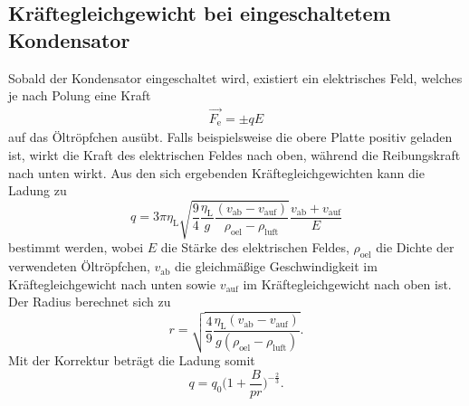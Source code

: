 \subsection{Kräftegleichgewicht bei eingeschaltetem Kondensator}
Sobald der Kondensator eingeschaltet wird, existiert ein elektrisches Feld, welches je nach Polung eine Kraft
\begin{align*}
  \vec{F_\text{e}} = \pm qE
\end{align*}
auf das Öltröpfchen ausübt.
Falls beispielsweise die obere Platte positiv geladen ist, wirkt die Kraft des elektrischen Feldes nach oben, während die Reibungskraft nach unten wirkt.
Aus den sich ergebenden Kräftegleichgewichten kann die Ladung zu
\begin{equation}
  q = 3 \pi \eta_\text{L} \sqrt{ \frac{9}{4} \frac{\eta_\text{L}}{g} \frac{ (v_\text{ab} - v_\text{auf}  )  }{\rho_\text{oel} - \rho_\text{luft}} } \frac{v_\text{ab} + v_\text{auf}}{E} \label{eqn:1}
\end{equation}
bestimmt werden, wobei $E$ die Stärke des elektrischen Feldes, $\rho_\text{oel}$ die Dichte der verwendeten Öltröpfchen, $v_\text{ab}$ die gleichmäßige Geschwindigkeit im Kräftegleichgewicht nach unten  sowie $v_\text{auf}$ im Kräftegleichgewicht nach oben ist.
Der Radius berechnet sich zu
\begin{equation}
  r = \sqrt{ \frac{4}{9} \frac{ \eta_\text{L} ( v_\text{ab} - v_\text{auf} ) }{g (\rho_\text{oel} - \rho_\text{luft}) }   }. \label{blubbr}
\end{equation}
Mit der Korrektur beträgt die Ladung somit
\begin{equation}
  q = q_0 \bigl( 1 + \frac{B}{p r}  \bigr)^{-\frac{2}{3}}. \label{blubb}
\end{equation}

